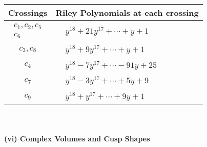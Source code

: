 \documentclass[1p]{elsarticle_modified}
\theoremstyle{definition}
\begin{document}
\begin{tabular}{m{50pt}|m{274pt}}
Crossings & \hspace{64pt}Riley Polynomials at each crossing \\
\hline $$\begin{aligned}c_{1},c_{2},c_{5}\\c_{6}\end{aligned}$$&$\begin{aligned}
&y^{18}+21 y^{17}+\cdots+y+1
\end{aligned}$\\
\hline $$\begin{aligned}c_{3},c_{8}\end{aligned}$$&$\begin{aligned}
&y^{18}+9 y^{17}+\cdots+y+1
\end{aligned}$\\
\hline $$\begin{aligned}c_{4}\end{aligned}$$&$\begin{aligned}
&y^{18}-7 y^{17}+\cdots-91 y+25
\end{aligned}$\\
\hline $$\begin{aligned}c_{7}\end{aligned}$$&$\begin{aligned}
&y^{18}-3 y^{17}+\cdots+5 y+9
\end{aligned}$\\
\hline $$\begin{aligned}c_{9}\end{aligned}$$&$\begin{aligned}
&y^{18}+y^{17}+\cdots+9 y+1
\end{aligned}$\\
\hline
\end{tabular}\\~\\
\newpage\flushleft \textbf{(vi) Complex Volumes and Cusp Shapes}
\end{document}
